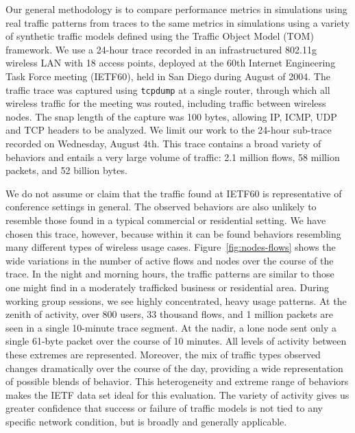 \documentclass[conference]{IEEEtran}
\newcommand{\caps}[1]{{\small{#1}}}
\begin{document}
Our general methodology is to compare performance metrics in simulations using real traffic patterns from traces to the same metrics in simulations using a variety of synthetic traffic models defined using the Traffic Object Model (\caps{TOM}) framework. We use a 24-hour trace recorded in an infrastructured 802.11g wireless \caps{LAN} with 18 access points, deployed at the 60th Internet Engineering Task Force meeting (\caps{IETF}60), held in San Diego during August of 2004. The traffic trace was captured using \texttt{\small{tcpdump}} at a single router, through which all wireless traffic for the meeting was routed, including traffic between wireless nodes. The snap length of the capture was 100 bytes, allowing \caps{IP}, \caps{ICMP}, \caps{UDP} and \caps{TCP} headers to be analyzed. We limit our work to the 24-hour sub-trace recorded on Wednesday, August 4th. This trace contains a broad variety of behaviors and entails a very large volume of traffic: 2.1 million flows, 58 million packets, and 52 billion bytes.

We do not assume or claim that the traffic found at \caps{IETF}60 is representative of conference settings in general. The observed behaviors are also unlikely to resemble those found in a typical commercial or residential setting. We have chosen this trace, however, because within it can be found behaviors resembling many different types of wireless usage cases. Figure~\ref{fig:nodes-flows} shows the wide variations in the number of active flows and nodes over the course of the trace. In the night and morning hours, the traffic patterns are similar to those one might find in a moderately trafficked business or residential area. During working group sessions, we see highly concentrated, heavy usage patterns. At the zenith of activity, over 800 users, 33 thousand flows, and 1 million packets are seen in a single 10-minute trace segment. At the nadir, a lone node sent only a single 61-byte packet over the course of 10 minutes. All levels of activity between these extremes are represented. Moreover, the mix of traffic types observed changes dramatically over the course of the day, providing a wide representation of possible blends of behavior. This heterogeneity and extreme range of behaviors makes the \caps{IETF} data set ideal for this evaluation. The variety of activity gives us greater confidence that success or failure of traffic models is not tied to any specific network condition, but is broadly and generally applicable. %
\end{document}
